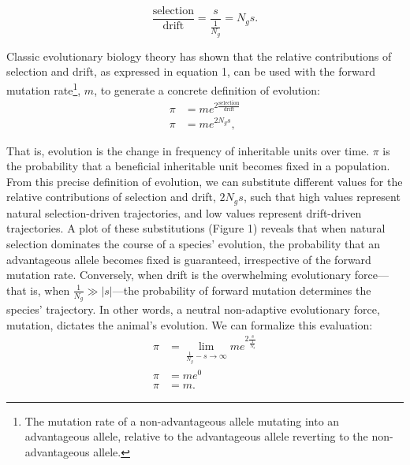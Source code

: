 \documentclass{article}
\begin{document}
\begingroup
\large
\begin{equation}
    \frac{\text{selection}}{\text{drift}} = \frac{s}{\frac{1}{N_g}} = N_g s.
\end{equation}
\endgroup

Classic evolutionary biology theory\cite{kimura1983neutral, Lynch_2007} has shown that the relative contributions of selection and drift, as expressed in equation 1, can be used with the forward mutation rate\footnote{The mutation rate of a non-advantageous allele mutating into an advantageous allele, relative to the advantageous allele reverting to the non-advantageous allele.}, $m$, to generate a concrete definition of evolution: 
\begingroup
\large
\begin{equation}
\begin{split}
    \pi & = m e^{2 \frac{\text{selection}}{\text{drift}}} \\
    \pi & = m e^{2N_g s},
\end{split}
\end{equation}
\endgroup

That is, evolution is the change in frequency of inheritable units over time. $\pi$ is the probability that a beneficial inheritable unit becomes fixed in a population. From this precise definition of evolution, we can substitute different values for the relative contributions of selection and drift, $2N_g s$, such that high values represent natural selection-driven trajectories, and low values represent drift-driven trajectories. A plot of these substitutions (Figure 1) reveals that when natural selection dominates the course of a species' evolution, the probability that an advantageous allele becomes fixed is guaranteed, irrespective of the forward mutation rate. Conversely, when drift is the overwhelming evolutionary force---that is, when $\frac{1}{N_g} \gg |s|$---the probability of forward mutation determines the species' trajectory. In other words, a neutral non-adaptive evolutionary force, mutation, dictates the animal's evolution. We can formalize this evaluation:
\begingroup
\large
\begin{equation}
\begin{split}
    \pi & = \lim_{\frac{1}{N_g} - s \to \infty} m e^{2 \frac{s}{\frac{1}{N_g}}} \\
    \pi &= m e^0 \\
    \pi & = m.
\end{split}
\end{equation}
\endgroup
\end{document}
